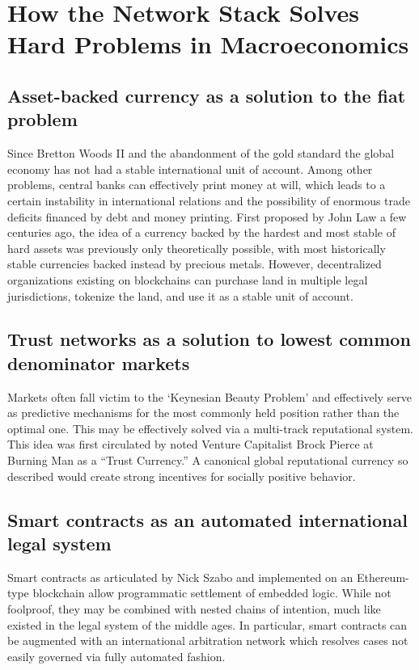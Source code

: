\documentclass{article}
\begin{document}
\section{How the Network Stack Solves Hard Problems in Macroeconomics }

\subsection {Asset-backed currency as a solution to the fiat problem
}

Since Bretton Woods II and the abandonment of the gold standard the global economy has not had a stable international unit of account. Among other problems, central banks can effectively print money at will, which leads to a certain instability in international relations and the possibility of enormous trade deficits financed by debt and money printing. First proposed by John Law a few centuries ago, the idea of a currency backed by the hardest and most stable of hard assets was previously only theoretically possible, with most historically stable currencies backed instead by precious metals. However, decentralized organizations existing on blockchains can purchase land in multiple legal jurisdictions, tokenize the land, and use it as a stable unit of account.

\subsection {Trust networks as a solution to lowest common denominator markets
}

Markets often fall victim to the ‘Keynesian Beauty Problem’ and effectively serve as predictive mechanisms for the most commonly held position rather than the optimal one.\cite{shillerkeynes} This may be effectively solved via a multi-track reputational system. This idea was first circulated by noted Venture Capitalist Brock Pierce at Burning Man as a “Trust Currency.” A canonical global reputational currency so described would create strong incentives for socially positive behavior.

\subsection {Smart contracts as an automated international legal system}

Smart contracts as articulated by Nick Szabo and implemented on an Ethereum-type blockchain allow programmatic settlement of embedded logic. While not foolproof, they may be combined with nested chains of intention, much like existed in the legal system of the middle ages. In particular, smart contracts can be augmented with an international arbitration network which resolves cases not easily governed via fully automated fashion.
\end{document}
